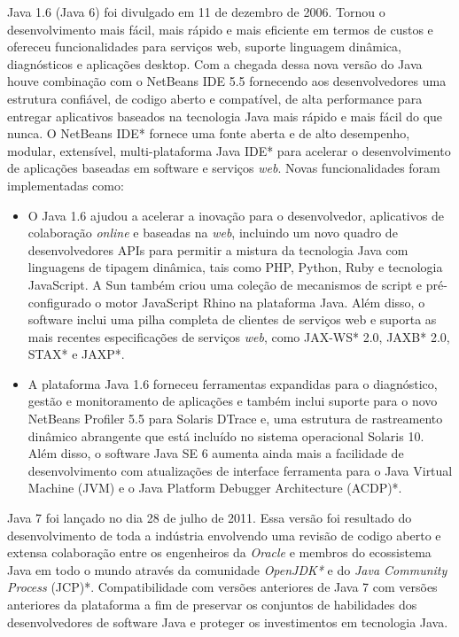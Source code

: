	Java 1.6 (Java 6) foi divulgado em 11 de dezembro de 2006. Tornou o desenvolvimento mais fácil, mais rápido e mais eficiente em termos de custos e ofereceu funcionalidades para serviços web, suporte linguagem dinâmica, diagnósticos e aplicações desktop. Com a chegada dessa nova versão do Java houve combinação com o NetBeans IDE 5.5 fornecendo aos desenvolvedores uma estrutura confiável, de codigo aberto e compatível, de alta performance para entregar aplicativos baseados na tecnologia Java mais rápido e mais fácil do que nunca. O NetBeans IDE* fornece uma fonte aberta e de alto desempenho, modular, extensível, multi-plataforma Java IDE* para acelerar o desenvolvimento de aplicações baseadas em software e serviços {\it web}.
	Novas funcionalidades foram implementadas como:

	\begin{itemize}
	  \item O Java 1.6 ajudou a acelerar a inovação para o desenvolvedor, aplicativos de colaboração {\it online} e baseadas na {\it web}, incluindo um novo quadro de desenvolvedores APIs para permitir a mistura da tecnologia Java com linguagens de tipagem dinâmica, tais como PHP, Python, Ruby e tecnologia JavaScript. A Sun também criou uma coleção de mecanismos de script e pré-configurado o motor JavaScript Rhino na plataforma Java. Além disso, o software inclui uma pilha completa de clientes de serviços web e suporta as mais recentes especificações de serviços {\it web}, como JAX-WS* 2.0, JAXB* 2.0, STAX* e JAXP*.
	  \item A plataforma Java 1.6 forneceu ferramentas expandidas para o diagnóstico, gestão e monitoramento de aplicações e também inclui suporte para o novo NetBeans Profiler 5.5 para Solaris DTrace e, uma estrutura de rastreamento dinâmico abrangente que está incluído no sistema operacional Solaris 10. Além disso, o software Java SE 6 aumenta ainda mais a facilidade de desenvolvimento com atualizações de interface ferramenta para o Java Virtual Machine (JVM) e o Java Platform Debugger Architecture (ACDP)*.
	\end{itemize}

	Java 7 foi lançado no dia 28 de julho de 2011. Essa versão foi resultado do desenvolvimento de toda a indústria envolvendo uma revisão de codigo aberto e extensa colaboração entre os engenheiros da {\it Oracle} e membros do ecossistema Java em todo o mundo através da comunidade {\it OpenJDK*} e do {\it Java Community Process} (JCP)*. Compatibilidade com versões anteriores de Java 7 com versões anteriores da plataforma a fim de preservar os conjuntos de habilidades dos desenvolvedores de software Java e proteger os investimentos em tecnologia Java.\\
		
